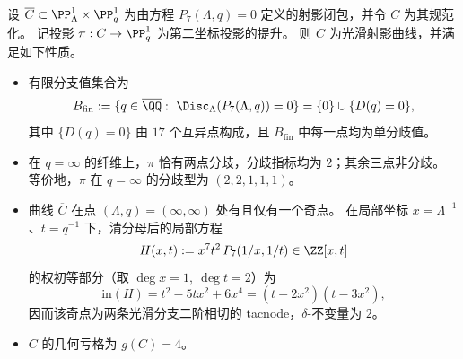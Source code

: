 \begin{theorem}\label{thm:real-input-40-p7-projective-branch-genus-tacnode}
设 \(\overline C\subset \PP^1_{\Lambda}\times \PP^1_{q}\) 为由方程 \(P_7(\Lambda,q)=0\) 定义的射影闭包，并令 \(C\) 为其规范化。
记投影 \(\pi:C\to\PP^1_{q}\) 为第二坐标投影的提升。
则 \(C\) 为光滑射影曲线，并满足如下性质。
\begin{itemize}
  \item 有限分支值集合为
  \[
  B_{\mathrm{fin}}
  :=\{q\in\overline{\QQ}:\ \Disc_{\Lambda}(P_7(\Lambda,q))=0\}
  =\{0\}\cup\{D(q)=0\},
  \]
  其中 \(\{D(q)=0\}\) 由 \(17\) 个互异点构成，且 \(B_{\mathrm{fin}}\) 中每一点均为单分歧值。
  \item 在 \(q=\infty\) 的纤维上，\(\pi\) 恰有两点分歧，分歧指标均为 \(2\)；其余三点非分歧。
  等价地，\(\pi\) 在 \(q=\infty\) 的分歧型为 \((2,2,1,1,1)\)。
  \item 曲线 \(\overline C\) 在点 \((\Lambda,q)=(\infty,\infty)\) 处有且仅有一个奇点。
  在局部坐标 \(x=\Lambda^{-1}\)、\(t=q^{-1}\) 下，清分母后的局部方程
  \[
  H(x,t):=x^{7}t^{2}\,P_7(1/x,1/t)\in\ZZ[x,t]
  \]
  的权初等部分（取 \(\deg x=1,\ \deg t=2\)）为
  \[
  \mathrm{in}(H)=t^{2}-5tx^{2}+6x^{4}=(t-2x^{2})(t-3x^{2}),
  \]
  因而该奇点为两条光滑分支二阶相切的 tacnode，\(\delta\)-不变量为 \(2\)。
  \item \(C\) 的几何亏格为 \(g(C)=4\)。
\end{itemize}
\end{theorem}
